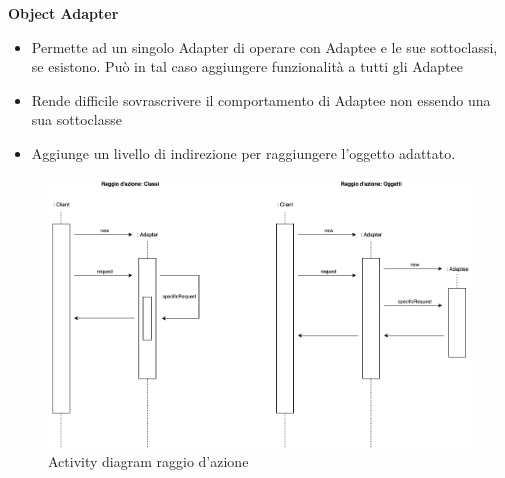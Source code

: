 \textbf{Object Adapter}
\begin{itemize}
    \item Permette ad un singolo Adapter di operare con Adaptee e le sue sottoclassi, se esistono. Può in tal caso aggiungere funzionalità a tutti gli Adaptee
    \item Rende difficile sovrascrivere il comportamento di Adaptee non essendo una sua sottoclasse
    \item Aggiunge un livello di indirezione per raggiungere l'oggetto adattato.
\end{itemize}

\begin{figure}[H]
    \centering
    \includegraphics[width=1\linewidth]{assets/pattern/adapter/adapter.drawio.png}
    \caption{Activity diagram raggio d'azione}
\end{figure}

\newpage